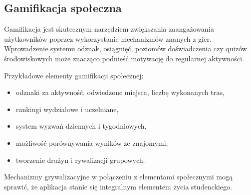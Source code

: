 \subsection{Gamifikacja społeczna}

Gamifikacja jest skutecznym narzędziem zwiększania zaangażowania użytkowników poprzez wykorzystanie mechanizmów znanych z gier. Wprowadzenie systemu odznak, osiągnięć, poziomów doświadczenia czy quizów środowiskowych może znacząco podnieść motywację do regularnej aktywności.

Przykładowe elementy gamifikacji społecznej:
\begin{itemize}
    \item odznaki za aktywność, odwiedzone miejsca, liczbę wykonanych tras,
    \item rankingi wydziałowe i uczelniane,
    \item system wyzwań dziennych i tygodniowych,
    \item możliwość porównywania wyników ze znajomymi,
    \item tworzenie drużyn i rywalizacji grupowych.
\end{itemize}

Mechanizmy grywalizacyjne w połączeniu z elementami społecznymi mogą sprawić, że aplikacja stanie się integralnym elementem życia studenckiego.

